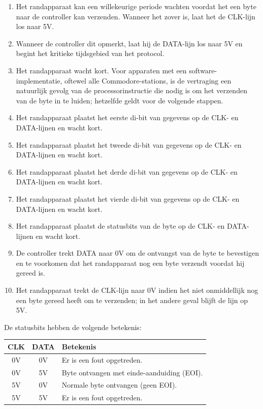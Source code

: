 \begin{enumerate}
\item Het randapparaat kan een willekeurige periode wachten voordat het een byte naar de controller kan verzenden. Wanneer het zover is, laat het de CLK-lijn los naar 5V.\item Wanneer de controller dit opmerkt, laat hij de DATA-lijn los naar 5V en begint het kritieke tijdsgebied van het protocol.\item Het randapparaat wacht kort. Voor apparaten met een software-implemen\-ta\-tie, oftewel alle Commodore{\texttrademark}-stations, is de vertraging een natuurlijk gevolg van de processorinstructie die nodig is om het verzenden van de byte in te luiden; hetzelfde geldt voor de volgende stappen.\item Het randapparaat plaatst het eerste di-bit van gegevens op de CLK- en DATA-lijnen en wacht kort.\item Het randapparaat plaatst het tweede di-bit van gegevens op de CLK- en DATA-lijnen en wacht kort.\item Het randapparaat plaatst het derde di-bit van gegevens op de CLK- en DATA-lijnen en wacht kort.\item Het randapparaat plaatst het vierde di-bit van gegevens op de CLK- en DATA-lijnen en wacht kort.\item Het randapparaat plaatst de statusbits van de byte op de CLK- en DATA-lijnen en wacht kort.\item De controller trekt DATA naar 0V om de ontvangst van de byte te bevestigen en te voorkomen dat het randapparaat nog een byte verzendt voordat hij gereed is.\item Het randapparaat trekt de CLK-lijn naar 0V indien het niet onmiddellijk nog een byte gereed heeft om te verzenden; in het andere geval blijft de lijn op 5V.
\end{enumerate}

De statusbits hebben de volgende betekenis:

\begin{center}
    \begin{longtable}{|c|c|L{7cm}|}
      \hline
        \textbf{CLK} & \textbf{DATA} & \textbf{Betekenis} \\
        \hline
        \endhead
        0V & 0V & Er is een fout opgetreden. \\
        \hline
        0V & 5V & Byte ontvangen met einde-aanduiding (EOI). \\
        \hline
        5V & 0V & Normale byte ontvangen (geen EOI). \\
        \hline
        5V & 5V & Er is een fout opgetreden. \\
        \hline
    \end{longtable}
\end{center}

